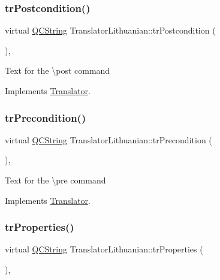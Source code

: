 \mbox{\label{class_translator_lithuanian_a4148e2c05761cb5b23a91aef0ee87dcb}} 
\subsubsection{\texorpdfstring{trPostcondition()}{trPostcondition()}}
{\footnotesize\ttfamily virtual \mbox{\hyperlink{class_q_c_string}{Q\+C\+String}} Translator\+Lithuanian\+::tr\+Postcondition (\begin{DoxyParamCaption}{ }\end{DoxyParamCaption})\hspace{0.3cm}{\ttfamily [inline]}, {\ttfamily [virtual]}}

Text for the \textbackslash{}post command 

Implements \mbox{\hyperlink{class_translator}{Translator}}.

\mbox{\label{class_translator_lithuanian_ae0142cd05e890ba622efa49876d03797}} 
\subsubsection{\texorpdfstring{trPrecondition()}{trPrecondition()}}
{\footnotesize\ttfamily virtual \mbox{\hyperlink{class_q_c_string}{Q\+C\+String}} Translator\+Lithuanian\+::tr\+Precondition (\begin{DoxyParamCaption}{ }\end{DoxyParamCaption})\hspace{0.3cm}{\ttfamily [inline]}, {\ttfamily [virtual]}}

Text for the \textbackslash{}pre command 

Implements \mbox{\hyperlink{class_translator}{Translator}}.

\mbox{\label{class_translator_lithuanian_ac83e2893cef0804a93ad3f4805374d68}} 
\subsubsection{\texorpdfstring{trProperties()}{trProperties()}}
{\footnotesize\ttfamily virtual \mbox{\hyperlink{class_q_c_string}{Q\+C\+String}} Translator\+Lithuanian\+::tr\+Properties (\begin{DoxyParamCaption}{ }\end{DoxyParamCaption})\hspace{0.3cm}{\ttfamily [inline]}, {\ttfamily [virtual]}}

